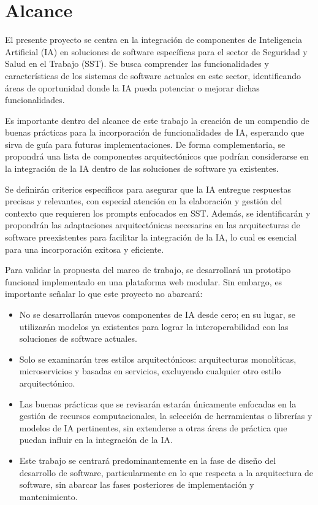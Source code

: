 \section{Alcance}
El presente proyecto se centra en la integración de componentes de Inteligencia Artificial (IA) en soluciones de software específicas para el sector de Seguridad y Salud en el Trabajo (SST). Se busca comprender las funcionalidades y características de los sistemas de software actuales en este sector, identificando áreas de oportunidad donde la IA pueda potenciar o mejorar dichas funcionalidades.

Es importante dentro del alcance de este trabajo la creación de un compendio de buenas prácticas para la incorporación de funcionalidades de IA, esperando que sirva de guía para futuras implementaciones. De forma complementaria, se propondrá una lista de componentes arquitectónicos que podrían considerarse en la integración de la IA dentro de las soluciones de software ya existentes.

Se definirán criterios específicos para asegurar que la IA entregue respuestas precisas y relevantes, con especial atención en la elaboración y gestión del contexto que requieren los prompts enfocados en SST. Además, se identificarán y propondrán las adaptaciones arquitectónicas necesarias en las arquitecturas de software preexistentes para facilitar la integración de la IA, lo cual es esencial para una incorporación exitosa y eficiente.

Para validar la propuesta del marco de trabajo, se desarrollará un prototipo funcional implementado en una plataforma web modular. Sin embargo, es importante señalar lo que este proyecto no abarcará:
\begin{itemize}
    \item No se desarrollarán nuevos componentes de IA desde cero; en su lugar, se utilizarán modelos ya existentes para lograr la interoperabilidad con las soluciones de software actuales.
    \item Solo se examinarán tres estilos arquitectónicos: arquitecturas monolíticas, microservicios y basadas en servicios, excluyendo cualquier otro estilo arquitectónico.
    \item Las buenas prácticas que se revisarán estarán únicamente enfocadas en la gestión de recursos computacionales, la selección de herramientas o librerías y modelos de IA pertinentes, sin extenderse a otras áreas de práctica que puedan influir en la integración de la IA.
    \item Este trabajo se centrará predominantemente en la fase de diseño del desarrollo de software, particularmente en lo que respecta a la arquitectura de software, sin abarcar las fases posteriores de implementación y mantenimiento.
\end{itemize}


